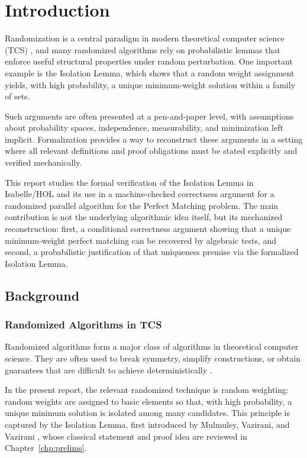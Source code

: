 \chapter{Introduction}
\label{chp:intro}

Randomization is a central paradigm in modern theoretical computer science (TCS) \cite{motwani1995randomized}, and many randomized algorithms rely on probabilistic lemmas that enforce useful structural properties under random perturbation.
One important example is the Isolation Lemma, which shows that a random weight assignment yields, with high probability, a unique minimum-weight solution within a family of sets.

Such arguments are often presented at a pen-and-paper level, with assumptions about probability spaces, independence, measurability, and minimization left implicit.
Formalization provides a way to reconstruct these arguments in a setting where all relevant definitions and proof obligations must be stated explicitly and verified mechanically.

This report studies the formal verification of the Isolation Lemma in Isabelle/HOL and its use in a machine-checked correctness argument for a randomized parallel algorithm for the Perfect Matching problem.
The main contribution is not the underlying algorithmic idea itself, but its mechanized reconstruction:
first, a conditional correctness argument showing that a unique minimum-weight perfect matching can be recovered by algebraic tests,
and second, a probabilistic justification of that uniqueness premise via the formalized Isolation Lemma.

\section{Background}
\subsection{Randomized Algorithms in TCS}
Randomized algorithms form a major class of algorithms in theoretical computer science.
They are often used to break symmetry, simplify constructions, or obtain guarantees that are difficult to achieve deterministically \cite{mulmuley1987matching,vazirani2001approximation}.

In the present report, the relevant randomized technique is random weighting:
random weights are assigned to basic elements so that, with high probability, a unique minimum solution is isolated among many candidates.
This principle is captured by the Isolation Lemma, first introduced by Mulmuley, Vazirani, and Vazirani \cite{mulmuley1987matching}, whose classical statement and proof idea are reviewed in Chapter~\ref{chp:prelims}.

